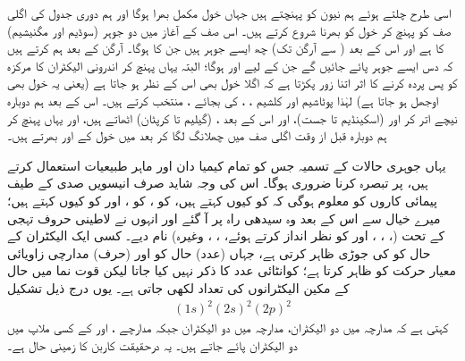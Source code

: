  
 اسی طرح چلتے ہوئے ہم نیون  کو پہنچتے ہیں جہاں  خول مکمل بھرا ہوگا اور ہم دوری جدول کی اگلی صف کو پہنچ کر  خول کو بھرنا شروع کرتے ہیں۔ اس صف کے آغاز میں دو جوہر (سوڈیم اور مگنیشیم) کا  ہے اور اس کے بعد ( سے آرگن تک) چھ ایسے جوہر ہیں جن کا  ہوگا۔ آرگن کے بعد ہم  کرتے ہیں کہ دس ایسے جوہر پائے جائیں گے جن کے لیے  اور  ہوگا؛ البتہ یہاں پہنچ کر اندرونی الیکٹران کا مرکزہ کو پس پردہ کرنے کا اثر اتنا زور پکڑتا ہے کہ اگلا خول بھی اس کے نظر ہو جاتا ہے (یعنی یہ خول بھی اوجھل ہو جاتا ہے) لہٰذا پوٹاشیم  اور کلشیم ، ،  کی
 بجائے ،  منتخب کرتے ہیں۔ اس کے بعد ہم دوبارہ نیچے اتر کر  اور  (اسکینڈیم تا جست)، اور اس کے بعد ، (گیلیم تا کرپٹان) اٹھاتے ہیں، اور یہاں پہنچ کر ہم دوبارہ قبل از وقت اگلی صف  میں چھلانگ لگا کر بعد میں  خول کے  اور  بھرتے ہیں۔
 
 یہاں جوہری حالات کے تسمیہ جس کو تمام کیمیا دان اور ماہر طبیعیات استعمال کرتے ہیں، پر تبصرہ کرنا ضروری ہوگا۔ اس کی وجہ شاید صرف انیسویں صدی کے طیف پیمائی کاروں کو معلوم ہوگی کہ  کو کیوں  کہتے ہیں،  کو ،  کو ، اور  کو کیوں  کہتے ہیں؛ میرے خیال سے اس کے بعد وہ سیدھی راہ پر آ گئے اور انہوں نے لاطینی حروف تہجی کے تحت (، ، ، اور  کو نظر انداز کرتے ہوئے، ، ، وغیرہ) نام دیے۔ کسی ایک الیکٹران کے حال کو  کی جوڑی ظاہر کرتی ہے، جہاں (عدد)  حال کو اور (حرف)  مدارچی زاویائی معیار حرکت کو ظاہر کرتا ہے؛ کوانٹائی عدد  کا ذکر نہیں کیا جاتا لیکن قوت نما میں حال کے مکین الیکٹرانوں کی تعداد لکھی جاتی ہے۔ یوں درج ذیل تشکیل
\begin{align}\label{مساوات_متماثل_الیکٹرانی_تشکیل}
(1s)^{2}(2s)^{2}(2p)^{2} 
\end{align}
کہتی ہے کہ مدارچہ  میں دو الیکٹران، مدارچہ  میں دو الیکٹران جبکہ مدارچے ،  اور  کے کسی ملاپ میں دو الیکٹران پائے جاتے ہیں۔ یہ درحقیقت کاربن کا زمینی حال ہے۔ 


